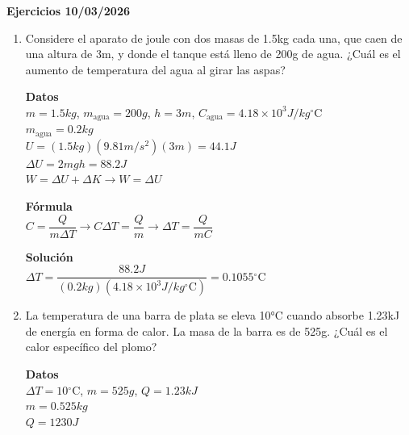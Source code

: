 \documentclass[a4paper, 11pt]{article}
\newcommand{\Pspace}{0.5cm}
\newcommand{\Aspace}{0.2cm}
\begin{document}
    \newpage
    {\Large \textbf{Ejercicios 10/03/2026}}
    \begin{enumerate}
    \vspace{\Pspace}
    \item Considere el aparato de joule con dos masas de 1.5kg cada una, que caen de una altura de 3m, y donde el tanque está lleno de 200g de agua. ¿Cuál es el aumento de temperatura del agua al girar las aspas? \par
        \vspace{\Aspace} \par
        { \color{azul}  
            \textbf{Datos} \\
            $m = 1.5 kg$, $m_{\text{agua}} = 200g$, $h = 3m$, $C_{\text{agua}} = 4.18 \times 10^{3} J/kg\mathrm{^\circ C}$ \\
            $m_{\text{agua}} = 0.2 kg$ \\
            $U = (1.5kg) (9.81 m/s^{2}) (3m) = 44.1 J$ \\
            $\Delta U = 2 mgh = 88.2 J$ \\
            $W = \Delta U + \Delta K \rightarrow W = \Delta U$ \par

            \textbf{Fórmula} \\
            $C = \dfrac{Q}{m \Delta T} \rightarrow C \Delta T = \dfrac{Q}{m} \rightarrow \Delta T = \dfrac{Q}{mC}$ \par

            \textbf{Solución} \\
            $\Delta T = \dfrac{88.2 J}{(0.2 kg) (4.18 \times 10^3 J/kg\mathrm{^\circ C})} = 0.1055\mathrm{^\circ C}$
        }



    \vspace{\Pspace}
    \item La temperatura de una barra de plata se eleva 10°C cuando absorbe 1.23kJ de energía en forma de calor. La masa de la barra es de 525g. ¿Cuál es el calor específico del plomo? \par
        \vspace{\Aspace} \par
        { \color{azul}  
            \textbf{Datos} \\
            $\Delta T = 10\mathrm{^\circ C}$, $m = 525g$, $Q = 1.23kJ$ \\
            $m = 0.525 kg$ \\
            $Q = 1230 J$ \par

}
\end{enumerate}
\end{document}
